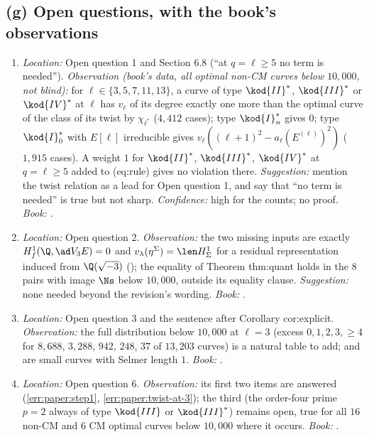 \begin{sloppypar}
\subsection*{(g) Open questions, with the book's observations}
\begin{enumerate}[resume*=errata]
\item\label{err:paper:oq1} \emph{Location:} Open question 1 and Section 6.8 (``at $q=\ell\ge5$ no term is needed''). \emph{Observation (book's data, all optimal non-CM curves below $10{,}000$, not blind):} for
$\ell\in\{3,5,7,11,13\}$, a curve of type $\kod{II}^*$, $\kod{III}^*$ or $\kod{IV}^*$ at $\ell$ has $v_\ell$ of its degree exactly one more than the optimal curve of the class of its twist by $\chi_{\ell^*}$ ($4{,}412$ cases);
type $\kod{I}_n^*$ gives $0$; type $\kod{I}_0^*$ with $E[\ell]$ irreducible gives $v_\ell((\ell+1)^2-a_\ell(E^{(\ell)})^2)$ ($1{,}915$ cases). A weight $1$ for $\kod{II}^*$, $\kod{III}^*$, $\kod{IV}^*$ at $q=\ell\ge5$ added to (eq:rule)
gives no violation there. \emph{Suggestion:} mention the twist relation as a lead for Open question 1, and say that ``no term is needed'' is true but not sharp. \emph{Confidence:} high for the
counts; no proof. \emph{Book:} .
\item\label{err:paper:oq2} \emph{Location:} Open question 2. \emph{Observation:} the two missing inputs are exactly $H^1_f(\Q,\ad V_3E)=0$ and $v_\lambda(\eta^\Sigma)=\len H^1_\Sigma$ for a residual representation induced
from $\Q(\sqrt{-3})$ (); the equality of Theorem thm:quant holds in the $8$ pairs with image $\Ns$ below $10{,}000$, outside its equality clause. \emph{Suggestion:} none
needed beyond the revision's wording. \emph{Book:} .
\item\label{err:paper:oq3} \emph{Location:} Open question 3 and the sentence after Corollary cor:explicit. \emph{Observation:} the full distribution below $10{,}000$ at $\ell=3$ (excess $0,1,2,3,\ge4$ for $8{,}688$,
$3{,}288$, $942$, $248$, $37$ of $13{,}203$ curves) is a natural table to add;  and  are small curves with Selmer length $1$. \emph{Book:} .
\item\label{err:paper:oq6} \emph{Location:} Open question 6. \emph{Observation:} its first two items are answered (\ref{err:paper:step1}, \ref{err:paper:twist-at-3}); the third (the order-four prime $p=2$ always of
type $\kod{III}$ or $\kod{III}^*$) remains open, true for all $16$ non-CM and $6$ CM optimal curves below $10{,}000$ where it occurs. \emph{Book:} .
\end{enumerate}


\end{sloppypar}
